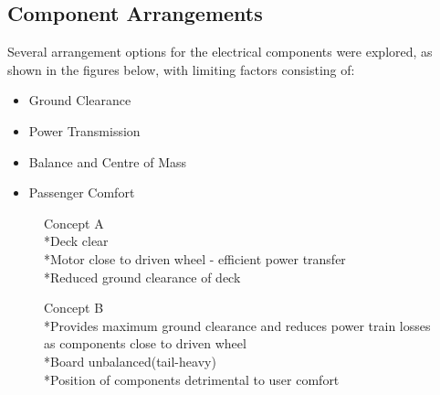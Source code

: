 \documentclass[journal,10pt]{IEEEtran}
\begin{document}
    \subsection{Component Arrangements}
        Several arrangement options for the electrical components were explored, as shown in the figures below, with limiting factors consisting of:
        \begin{itemize}
            	\item Ground Clearance
            	\item Power Transmission
            	\item Balance and Centre of Mass
            	\item Passenger Comfort
            \end{itemize}
        \begin{figure}[H]
                \centering
                \caption{Concept A
                \\*Deck clear
                \\*Motor close to driven wheel - efficient power transfer
                \\*Reduced ground clearance of deck}
                \label{fig:ConceptA}
            \end{figure} 
        \begin{figure}[H]
                \centering
                \caption{Concept B
                \\*Provides maximum ground clearance and reduces power train losses as components close to driven wheel
                \\*Board unbalanced(tail-heavy)
                \\*Position of components detrimental to user comfort}
                \label{fig:ConceptB}
            \end{figure}  
\end{document}
